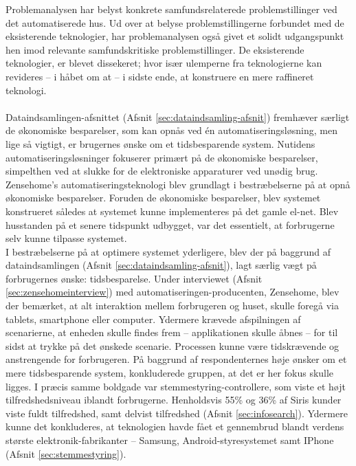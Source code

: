Problemanalysen har belyst konkrete samfundsrelaterede problemstillinger ved det automatiserede hus. Ud over at belyse problemstillingerne forbundet med de eksisterende teknologier, har problemanalysen også givet et solidt udgangspunkt hen imod relevante samfundskritiske problemstillinger. De eksisterende teknologier, er blevet dissekeret; hvor især ulemperne fra teknologierne kan revideres – i håbet om at – i sidste ende, at konstruere en mere raffineret teknologi. \\\\
Dataindsamlingen-afsnittet (Afsnit \ref{sec:dataindsamling-afsnit}) fremhæver særligt de økonomiske besparelser, som kan opnås ved én automatiseringsløsning, men lige så vigtigt, er brugernes ønske om et tidsbesparende system. Nutidens automatiseringsløsninger fokuserer primært på de økonomiske besparelser, simpelthen ved at slukke for de elektroniske apparaturer ved unødig brug. Zensehome’s automatiseringsteknologi blev grundlagt i bestræbelserne på at opnå økonomiske besparelser. Foruden de økonomiske besparelser, blev systemet konstrueret således at systemet kunne implementeres på det gamle el-net. Blev husstanden på et senere tidspunkt udbygget, var det essentielt, at forbrugerne selv kunne tilpasse systemet. \\
I bestræbelserne på at optimere systemet yderligere, blev der på baggrund af dataindsamlingen (Afsnit \ref{sec:dataindsamling-afsnit}), lagt særlig vægt på forbrugernes ønske: tidsbesparelse. Under interviewet (Afsnit \ref{sec:zensehomeinterview}) med automatiseringen-producenten, Zensehome, blev der bemærket, at alt interaktion mellem forbrugeren og huset, skulle foregå via tablets, smartphone eller computer. Ydermere krævede afspilningen af scenarierne, at enheden skulle findes frem – applikationen skulle åbnes – for til sidst at trykke på det ønskede scenarie. Processen kunne være tidskrævende og anstrengende for forbrugeren. På baggrund af respondenternes høje ønsker om et mere tidsbesparende system, konkluderede gruppen, at det er her fokus skulle ligges. I præcis samme boldgade var stemmestyring-controllere, som viste et højt tilfredshedsniveau iblandt forbrugerne. Henholdsvis 55\% og 36\% af Siris kunder viste fuldt tilfredshed, samt delvist tilfredshed (Afsnit \ref{sec:infosearch}). Ydermere kunne det konkluderes, at teknologien havde fået et gennembrud blandt verdens største elektronik-fabrikanter – Samsung, Android-styresystemet samt IPhone (Afsnit \ref{sec:stemmestyring}).
